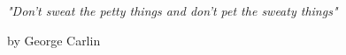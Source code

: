 
\null\vskip5cm%
\begin{flushright}
	\em %
	"Don't sweat the petty things and don't pet the sweaty things"
	
	\medskip
	\raggedleft
	by George Carlin
\end{flushright}
\vfill\newpage

